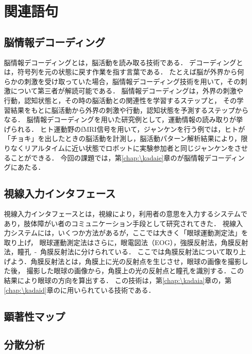 \chapter{関連語句}
\section{脳情報デコーディング}
脳情報デコーディングとは，脳活動を読み取る技術である．
デコーディングとは，符号列を元の状態に戻す作業を指す言葉である．
たとえば脳が外界から何らかの刺激を受け取っていた場合，脳情報デコーディング技術を用いて，その刺激について第三者が解読可能である．
脳情報デコーディングは，外界の刺激や行動，認知状態と，その時の脳活動との関連性を学習するステップと，
その学習結果をもとに脳活動から外界の刺激や行動，認知状態を予測するステップからなる．
脳情報デコーディングを用いた研究例として，運動情報の読み取りが挙げられる．
ヒト運動野のfMRI信号を用いて，ジャンケンを行う例では，ヒトが「チョキ」を出したときの脳活動を計測し，脳活動パターン解析結果により，限りなくリアルタイムに近い状態でロボットに実験参加者と同じジャンケンをさせることができる．
今回の課題では，第\ref{chap:\kadaie}章の\kadaie が脳情報デコーディングにあたる．\\
\hfill\cite{脳情報デコーディング技術とその応用}
\section{視線入力インタフェース}
視線入力インタフェースとは，視線により，利用者の意思を入力するシステムであり，肢体障がい者のコミュニケーション手段として研究されてきた．
視線入力システムには，いくつか方法があるが，ここでは大きく「眼球運動測定法」を取り上げ，
眼球運動測定法はさらに，眼電図法（EOG），強膜反射法，角膜反射法，瞳孔\ -\ 角膜反射法に分けられている．
ここでは角膜反射法について取り上げよう．角膜反射法とは，角膜上に光の反射点を生じさせ，眼球の画像を撮影した後，
撮影した眼球の画像から，角膜上の光の反射点と瞳孔を識別する．この結果により眼球の方向を算出する．
この技術は，第\ref{chap:\kadaia}章の\elt ，第\ref{chap:\kadaid}章の\tobi に用いられている技術である．\\
\hfill\cite{weko_847_1}
\section{顕著性マップ}
\section{分散分析}